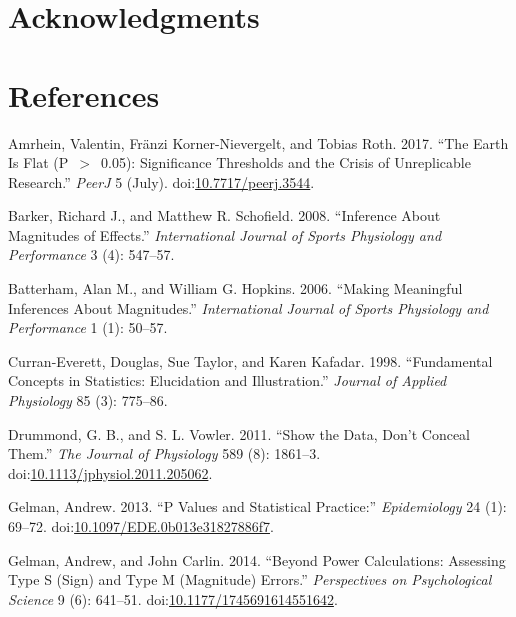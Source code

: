 \documentclass[]{article}
\theoremstyle{definition}
\theoremstyle{definition}
\theoremstyle{definition}
\theoremstyle{remark}
\begin{document}
\section*{Acknowledgments}\label{acknowledgments}

\section*{References}\label{references}

\hypertarget{refs}{}
\hypertarget{ref-Amrhein_earth_2017b}{}
Amrhein, Valentin, Fränzi Korner-Nievergelt, and Tobias Roth. 2017.
``The Earth Is Flat (P~\(>\)~0.05): Significance Thresholds and the
Crisis of Unreplicable Research.'' \emph{PeerJ} 5 (July).
doi:\href{https://doi.org/10.7717/peerj.3544}{10.7717/peerj.3544}.

\hypertarget{ref-Barker_Inference_2008}{}
Barker, Richard J., and Matthew R. Schofield. 2008. ``Inference About
Magnitudes of Effects.'' \emph{International Journal of Sports
Physiology and Performance} 3 (4): 547--57.

\hypertarget{ref-Batterham_Making_2006}{}
Batterham, Alan M., and William G. Hopkins. 2006. ``Making Meaningful
Inferences About Magnitudes.'' \emph{International Journal of Sports
Physiology and Performance} 1 (1): 50--57.

\hypertarget{ref-Curran-Everett_Fundamental_1998}{}
Curran-Everett, Douglas, Sue Taylor, and Karen Kafadar. 1998.
``Fundamental Concepts in Statistics: Elucidation and Illustration.''
\emph{Journal of Applied Physiology} 85 (3): 775--86.

\hypertarget{ref-Drummond_Show_2011}{}
Drummond, G. B., and S. L. Vowler. 2011. ``Show the Data, Don't Conceal
Them.'' \emph{The Journal of Physiology} 589 (8): 1861--3.
doi:\href{https://doi.org/10.1113/jphysiol.2011.205062}{10.1113/jphysiol.2011.205062}.

\hypertarget{ref-Gelman_Values_2013}{}
Gelman, Andrew. 2013. ``P Values and Statistical Practice:''
\emph{Epidemiology} 24 (1): 69--72.
doi:\href{https://doi.org/10.1097/EDE.0b013e31827886f7}{10.1097/EDE.0b013e31827886f7}.

\hypertarget{ref-Gelman_Power_2014}{}
Gelman, Andrew, and John Carlin. 2014. ``Beyond Power Calculations:
Assessing Type S (Sign) and Type M (Magnitude) Errors.''
\emph{Perspectives on Psychological Science} 9 (6): 641--51.
doi:\href{https://doi.org/10.1177/1745691614551642}{10.1177/1745691614551642}.
\end{document}
